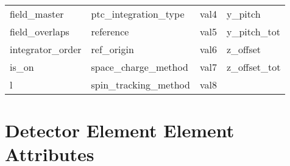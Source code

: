 \begin{tabular}{llll}
field_master                & ptc_integration_type        & val4                        & y_pitch                     \\
field_overlaps              & reference                   & val5                        & y_pitch_tot                 \\
integrator_order            & ref_origin                  & val6                        & z_offset                    \\
is_on                       & space_charge_method         & val7                        & z_offset_tot                \\
l                           & spin_tracking_method        & val8                        &                             \\
 \bottomrule
 \end{tabular}
 \vfill
 
 \section{Detector Element Element Attributes}
 \label{s:list.detector}
 
